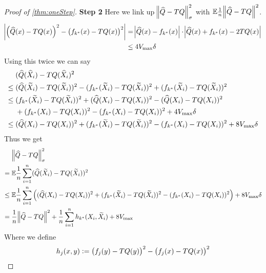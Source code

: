 \begin{proof}[Proof of \cref{thm:oneStep}]
  \textbf{Step 2} Here we link up $\norm{\widehat{Q} - TQ}_{\sigma}^2$ 
  with $\mathbb{E} \frac{1}{n} \norm{\widehat{Q} -TQ}^2$.
  \begin{align}
    \abs{ \left( \widehat{Q}(x) - TQ(x) \right)^2
    - \left( f_{k^*}(x) - TQ(x) \right)^2 }
    &= \abs{ \widehat{Q}(x) - f_{k^*}(x) } \cdot
    \abs{ \widehat{Q}(x) + f_{k^*}(x) - 2 TQ(x) }
    \\ & \leq 4 V_{\max} \delta
  \end{align}
  Using this twice we can say
  \begin{align}
    & (\widehat{Q}(\widehat{X}_i) - TQ(\widehat{X}_i)^2 
    \\ \leq {} & (\widehat{Q}(\widetilde{X}_i) - TQ(\widetilde{X}_i))^2
    - (f_{k^*}(\widetilde{X}_i) - TQ(\widetilde{X}_i))^2
    + (f_{k^*}(\widetilde{X}_i) - TQ(\widetilde{X}_i))^2 
    \\ \leq {} & (f_{k^*}(\widetilde{X}_i) - TQ(\widetilde{X}_i))^2 
    + (\widehat{Q}(X_i) - TQ(X_i))^2
    - (\widehat{Q}(X_i) - TQ(X_i))^2
    \notag \\ & + (f_{k^*}(X_i) - TQ(X_i))^2
    - (f_{k^*}(X_i) - TQ(X_i))^2 + 4 V_{\max} \delta
    \\ \leq {} & (\widehat{Q}(X_i) - TQ(X_i))^2
    + (f_{k^*}(\widetilde{X}_i) - TQ(\widetilde{X}_i))^2
    - (f_{k^*}(X_i) - TQ(X_i))^2
    + 8 V_{\max} \delta
    \label{eq:c2step2long1}
  \end{align}
  Thus we get
  \begin{align}
    & \norm{\widehat{Q} - TQ}_\sigma^2
    \\ = {} & \mathbb{E} \frac{1}{n} \sum_{i=1}^n (\widehat{Q}(\widetilde{X}_i) - TQ(\widetilde{X}_i))^2
    \\ \leq {} & \mathbb{E} \frac{1}{n} \sum_{i=1}^n \left( (\widehat{Q}(X_i) - TQ(X_i))^2 
      + (f_{k^*}(\widetilde{X}_i) - TQ(\widetilde{X}_i))^2
    - (f_{k^*}(X_i) - TQ(X_i))^2 \right)
    + 8 V_{\max} \delta 
    \\ = {} & \frac{1}{n} \norm{\widehat{Q} - TQ}^2
    + \frac{1}{n} \sum_{i=1}^n h_{k^*}(X_i, \widetilde{X}_i)
    + 8 V_{\max}
  \end{align}
  Where we define
  \begin{equation}
    h_j(x, y) \vcentcolon= \left( f_j(y) - TQ(y) \right)^2
    - \left( f_j(x) - TQ(x) \right)^2
    \label{eq:c2step2hdef}
  \end{equation}
  
\end{proof}



